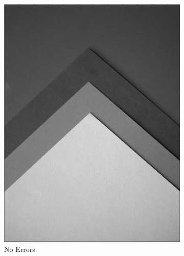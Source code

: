 \documentclass[landscape,a0paper,fontscale=0.5]{baposter} %
\begin{document}
\begin{poster}
{\begin{figure}[H]
\begin{subfigure}{0.2\textwidth}
		\includegraphics[scale=0.115]{8Pattern.jpg}
		\caption{No Errors} %
	\end{subfigure}
	\begin{subfigure}{0.2\textwidth} %

\end{subfigure}
\end{figure}}
\end{poster}
\end{document}
